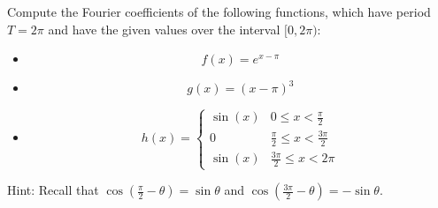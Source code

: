 \documentclass[11pt]{article}
\begin{document}




\begin{exercise}
    Compute the Fourier coefficients of the following functions, which have period $T = 2\pi$ and have the given values over the interval $[0,2\pi)$:
    \begin{itemize}
     \item 
     \[
        f(x) = e^{x - \pi}
     \]
     \item 
     \[
        g(x) = {(x - \pi)^3}
     \]
     \item 
     \[
        h(x) = \left\{\begin{array}{ll}
            \sin(x) & 0 \leq x < \frac \pi 2
            \\
            0   & \frac \pi 2 \leq x < \frac{3\pi}{2} 
            \\
            \sin(x) & \frac {3\pi} 2 \leq x < 2\pi
        \end{array}\right.
     \]
    \end{itemize}
    Hint: Recall that $\cos(\frac \pi 2 - \theta) = \sin \theta$ and $\cos(\frac{3 \pi}{2} - \theta) = - \sin \theta$.
\end{exercise}
\end{document}
